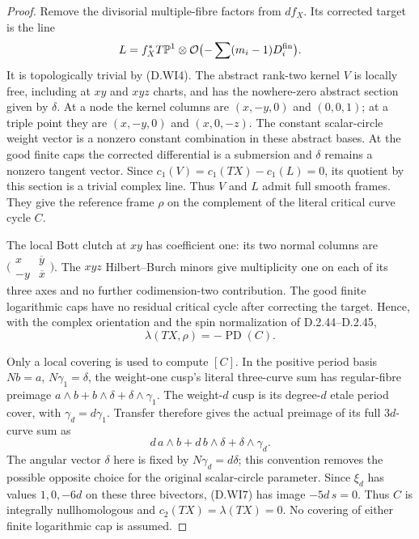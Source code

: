 \begin{proof}
Remove the divisorial multiple-fibre factors from $df_X$.  Its
corrected target is the line
\[
 L=f_X^*T\mathbb P^1\otimes
                      \mathcal O\bigl(-\sum (m_i-1)D_i^{\rm fin}\bigr).
\]
It is topologically trivial by (D.WI4).  The abstract rank-two
kernel $V$ is locally free, including at $xy$ and $xyz$ charts,
and has the nowhere-zero abstract section given by $\delta$.
At a node the kernel columns are $(x,-y,0)$ and $(0,0,1)$;
at a triple point they are $(x,-y,0)$ and $(x,0,-z)$.
The constant scalar-circle weight vector is a nonzero constant
combination in these abstract bases.  At the good finite caps
the corrected differential is a submersion and $\delta$ remains
a nonzero tangent vector.  Since
$c_1(V)=c_1(TX)-c_1(L)=0$, its quotient by this section is a
trivial complex line.  Thus $V$ and $L$ admit full smooth frames.
They give the reference frame $\rho$ on the complement of the
literal critical curve cycle $C$.

The local Bott clutch at $xy$ has coefficient one:
its two normal columns are
$\bigl(\begin{smallmatrix}x&\overline y\\-y&\overline x\end{smallmatrix}\bigr)$.
The $xyz$ Hilbert--Burch minors give multiplicity one on each
of its three axes and no further codimension-two contribution.
The good finite logarithmic caps have no residual critical
cycle after correcting the target.  Hence, with the complex
orientation and the spin normalization of D.2.44--D.2.45,
\[
                 \lambda(TX,\rho)=-\operatorname{PD}(C).
 \tag{D.WI6}
\]

Only a local covering is used to compute $[C]$.
In the positive period basis
$N b=a$, $N\gamma_1=\delta$, the weight-one cusp's literal
three-curve sum has regular-fibre preimage
$a\wedge b+b\wedge\delta+\delta\wedge\gamma_1$.
The weight-$d$ cusp is its degree-$d$ etale period cover, with
$\gamma_d=d\gamma_1$.  Transfer therefore gives the actual
preimage of its full $3d$-curve sum as
\[
 d\,a\wedge b+d\,b\wedge\delta+\delta\wedge\gamma_d.
 \tag{D.WI7}
\]
The angular vector $\delta$ here is fixed by
$N\gamma_d=d\delta$; this convention removes the possible
opposite choice for the original scalar-circle parameter.
Since $\xi_d$ has values $1,0,-6d$ on these three bivectors,
(D.WI7) has image $-5d\,s=0$.  Thus $C$ is integrally
nullhomologous and $c_2(TX)=\lambda(TX)=0$.
No covering of either finite logarithmic cap is assumed.


\end{proof}
